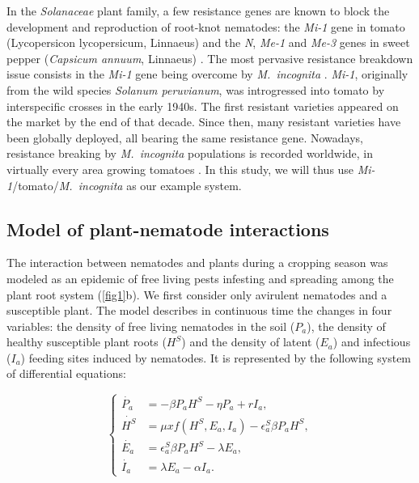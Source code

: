 {{{{In the \textit{Solanaceae} plant family, a few resistance genes are
known to block the development and reproduction of root-knot
nematodes: the \textit{Mi-1} gene in tomato (Lycopersicon
lycopersicum, Linnaeus) \citep{Milligan1998} and the\textit{ N},
\textit{Me-1} and \textit{Me-3 }genes in sweet pepper
(\textit{Capsicum annuum}, Linnaeus)
\citep{Djian-Caporalino2007,Djian-Caporalino2011}.  The most pervasive
resistance breakdown issue consists in the \textit{Mi-1} gene being
overcome by \textit{M.\ incognita} \citep{Ornat2001,Seid2015}.
\textit{Mi-1}, originally from the wild species \textit{Solanum
  peruvianum}, was introgressed into tomato by interspecific crosses
in the early 1940s.  The first resistant varieties appeared on the
market by the end of that decade. Since then, many resistant varieties
have been globally deployed, all bearing the same resistance
gene. Nowadays, resistance breaking by \textit{M.\ incognita}
populations is recorded worldwide, in virtually every area growing
tomatoes \citep{Seid2015}. In this study, we will thus use
  \textit{Mi-1}/tomato/\textit{M.\ incognita} as our example system.


\subsection{Model of plant-nematode interactions}

The interaction between nematodes and plants during a cropping season
was modeled as an epidemic of free living pests infesting and
spreading among the plant root system (\autoref{fig1}b). We
first consider only avirulent nematodes and a susceptible plant. The
model describes in continuous time the changes in four variables: the
density of free living nematodes in the soil ($P_{a}$), the density of
healthy susceptible plant roots ($H^{S}$) and the density of latent
($E_{a}$) and infectious ($I_{a}$) feeding sites induced by nematodes.
It is represented by the following system of differential equations:

\begin{equation}
  \left\{
    \begin{aligned}
      \dot{P_{a}} & =-\beta P_{a}H^{S}-\eta P_{a}+rI_{a},\\
      \dot{H^{S}} & =\mu xf(H^{S},E_{a},I_{a})-\epsilon_{a}^{S}\beta P_{a}H^{S},\\
      \dot{E_{a}} & =\epsilon_{a}^{S}\beta P_{a}H^{S}-\lambda E_{a},\\
      \dot{I_{a}} & =\lambda E_{a}-\alpha I_{a}.
    \end{aligned}
  \right.
  \label{sys0}
\end{equation}

}}}}
